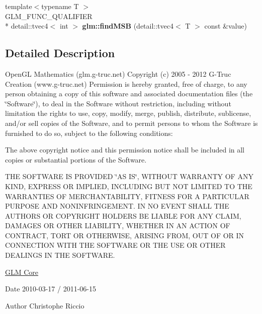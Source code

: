 \begin{DoxyCompactItemize}
\item 
\hypertarget{namespaceglm_aa14dd21dcab7f0510096f33e71a6bad6}{{\footnotesize template$<$typename T $>$ }\\G\-L\-M\-\_\-\-F\-U\-N\-C\-\_\-\-Q\-U\-A\-L\-I\-F\-I\-E\-R \\*
detail\-::tvec4$<$ int $>$ {\bfseries glm\-::find\-M\-S\-B} (detail\-::tvec4$<$ T $>$ const \&value)}\label{namespaceglm_aa14dd21dcab7f0510096f33e71a6bad6}

\end{DoxyCompactItemize}


\subsection{Detailed Description}
Open\-G\-L Mathematics (glm.\-g-\/truc.\-net) Copyright (c) 2005 -\/ 2012 G-\/\-Truc Creation (www.\-g-\/truc.\-net) Permission is hereby granted, free of charge, to any person obtaining a copy of this software and associated documentation files (the \char`\"{}\-Software\char`\"{}), to deal in the Software without restriction, including without limitation the rights to use, copy, modify, merge, publish, distribute, sublicense, and/or sell copies of the Software, and to permit persons to whom the Software is furnished to do so, subject to the following conditions\-:

The above copyright notice and this permission notice shall be included in all copies or substantial portions of the Software.

T\-H\-E S\-O\-F\-T\-W\-A\-R\-E I\-S P\-R\-O\-V\-I\-D\-E\-D \char`\"{}\-A\-S I\-S\char`\"{}, W\-I\-T\-H\-O\-U\-T W\-A\-R\-R\-A\-N\-T\-Y O\-F A\-N\-Y K\-I\-N\-D, E\-X\-P\-R\-E\-S\-S O\-R I\-M\-P\-L\-I\-E\-D, I\-N\-C\-L\-U\-D\-I\-N\-G B\-U\-T N\-O\-T L\-I\-M\-I\-T\-E\-D T\-O T\-H\-E W\-A\-R\-R\-A\-N\-T\-I\-E\-S O\-F M\-E\-R\-C\-H\-A\-N\-T\-A\-B\-I\-L\-I\-T\-Y, F\-I\-T\-N\-E\-S\-S F\-O\-R A P\-A\-R\-T\-I\-C\-U\-L\-A\-R P\-U\-R\-P\-O\-S\-E A\-N\-D N\-O\-N\-I\-N\-F\-R\-I\-N\-G\-E\-M\-E\-N\-T. I\-N N\-O E\-V\-E\-N\-T S\-H\-A\-L\-L T\-H\-E A\-U\-T\-H\-O\-R\-S O\-R C\-O\-P\-Y\-R\-I\-G\-H\-T H\-O\-L\-D\-E\-R\-S B\-E L\-I\-A\-B\-L\-E F\-O\-R A\-N\-Y C\-L\-A\-I\-M, D\-A\-M\-A\-G\-E\-S O\-R O\-T\-H\-E\-R L\-I\-A\-B\-I\-L\-I\-T\-Y, W\-H\-E\-T\-H\-E\-R I\-N A\-N A\-C\-T\-I\-O\-N O\-F C\-O\-N\-T\-R\-A\-C\-T, T\-O\-R\-T O\-R O\-T\-H\-E\-R\-W\-I\-S\-E, A\-R\-I\-S\-I\-N\-G F\-R\-O\-M, O\-U\-T O\-F O\-R I\-N C\-O\-N\-N\-E\-C\-T\-I\-O\-N W\-I\-T\-H T\-H\-E S\-O\-F\-T\-W\-A\-R\-E O\-R T\-H\-E U\-S\-E O\-R O\-T\-H\-E\-R D\-E\-A\-L\-I\-N\-G\-S I\-N T\-H\-E S\-O\-F\-T\-W\-A\-R\-E.

\hyperlink{group__core}{G\-L\-M Core}

\begin{DoxyDate}{Date}
2010-\/03-\/17 / 2011-\/06-\/15 
\end{DoxyDate}
\begin{DoxyAuthor}{Author}
Christophe Riccio 
\end{DoxyAuthor}
